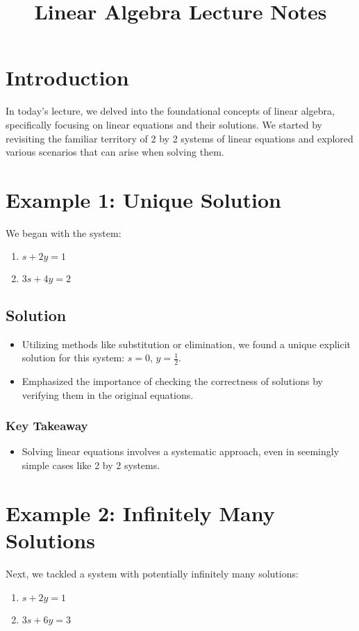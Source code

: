 \documentclass{article}
\title{Linear Algebra Lecture Notes}
\author{}
\date{}
\begin{document}
\maketitle

\tableofcontents

\newpage

\section{Introduction}
In today's lecture, we delved into the foundational concepts of linear algebra, specifically focusing on linear equations and their solutions. We started by revisiting the familiar territory of 2 by 2 systems of linear equations and explored various scenarios that can arise when solving them.

\section{Example 1: Unique Solution}
We began with the system:
\begin{enumerate}
    \item $s + 2y = 1$
    \item $3s + 4y = 2$
\end{enumerate}

\subsection{Solution}
\begin{itemize}
    \item Utilizing methods like substitution or elimination, we found a unique explicit solution for this system: $s = 0$, $y = \frac{1}{2}$.
    \item Emphasized the importance of checking the correctness of solutions by verifying them in the original equations.
\end{itemize}

\subsubsection{Key Takeaway}
\begin{itemize}
    \item Solving linear equations involves a systematic approach, even in seemingly simple cases like 2 by 2 systems.
\end{itemize}

\section{Example 2: Infinitely Many Solutions}
Next, we tackled a system with potentially infinitely many solutions:
\begin{enumerate}
    \item $s + 2y = 1$
    \item $3s + 6y = 3$
\end{enumerate}
\end{document}
